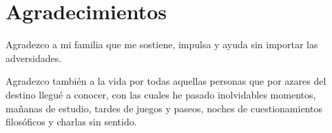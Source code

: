 \chapter*{Agradecimientos}
Agradezco a mi familia que me sostiene, impulsa
y ayuda sin importar las adversidades.

Agradezco también a la vida por todas aquellas personas 
que por azares del destino llegué a conocer, con las 
cuales he pasado inolvidables momentos, mañanas de estudio,
tardes de juegos y paseos, noches de cuestionamientos 
filosóficos y charlas sin sentido.